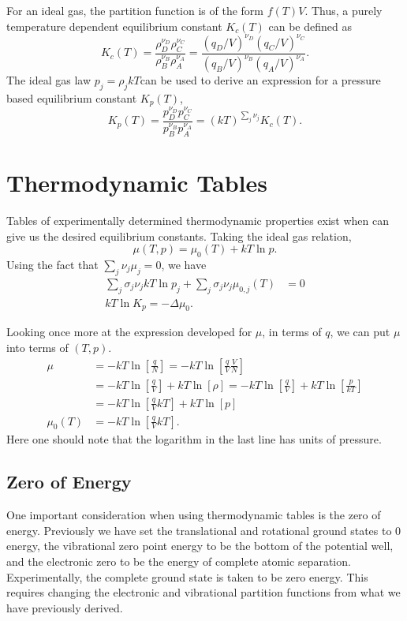 For an ideal gas, the partition function is of the form $f(T) V$. Thus, a purely
temperature dependent equilibrium constant $K_c (T)$ can be defined as
\begin{equation*}
	K_c (T) = \frac{\rho_{D}^{\nu_D}\rho_{C}^{\nu_C}}
	{\rho_{B}^{\nu_B}\rho_{A}^{\nu_A}} =
	\frac{{(q_{D}/V)}^{\nu_D}{(q_{C}/V)}^{\nu_C}}
	{{(q_{B}/V)}^{\nu_B}{(q_{A}/V)}^{\nu_A}}.
\end{equation*}
The ideal gas law $p_j = \rho_j kT$can be used to derive an expression for a pressure based
equilibrium constant $K_p (T)$,
\begin{equation*}
	K_p(T) = \frac{p_{D}^{\nu_D}p_{C}^{\nu_C}}{p_{B}^{\nu_B}p_{A}^{\nu_A}} =
	(kT)^{\sum_{j}{\nu_{j}}} K_c (T).
\end{equation*}

\section{Thermodynamic Tables}%
\label{sec:chemeqtt}
Tables of experimentally determined thermodynamic properties exist when can give
us the desired equilibrium constants. Taking the ideal gas relation,
\begin{equation*}
	\mu(T,p) = \mu_0 (T) + kT\ln{p}.
\end{equation*}
Using the fact that $\sum_{j}{\nu_j \mu_j} = 0$, we have
\begin{align*}
	\sum_{j}{\sigma_j \nu_j kT\ln{p_{j}}} + \sum_{j}{\sigma_j \nu_j
	\mu_{0,j}(T)} &= 0\\
	kT\ln{K_{p}} = - {\Delta \mu_{0}}.
\end{align*}

Looking once more at the expression developed for $\mu$, in terms of $q$, we can
put $\mu$ into terms of $(T, p)$.
\begin{align*}
	\mu &= -kT\ln{\left[\frac{q}{N}\right]} = 
	-kT\ln{\left[\frac{q}{V} \frac{V}{N}\right]}\\
		&= -kT\ln{\left[\frac{q}{V} \right]} + kT\ln{[\rho]} =
		-kT\ln{\left[\frac{q}{V} \right]} + kT\ln{\left[ \frac{p}{kT} \right]} \\
		&= -kT\ln{\left[\frac{q}{V} kT \right]} + kT\ln{[p]} \\
	\mu_0 (T) &= -kT\ln{\left[\frac{q}{V} kT \right]}.
\end{align*}
Here one should note that the logarithm in the last line has units of pressure.
\subsection{Zero of Energy}
One important consideration when using thermodynamic tables is the zero of
energy. Previously we have set the translational and rotational ground states to
0 energy, the vibrational zero point energy to be the bottom of the potential
well, and the electronic zero to be the energy of complete atomic separation.
Experimentally, the complete ground state is taken to be zero energy. This
requires changing the electronic and vibrational partition functions from what
we have previously derived.

